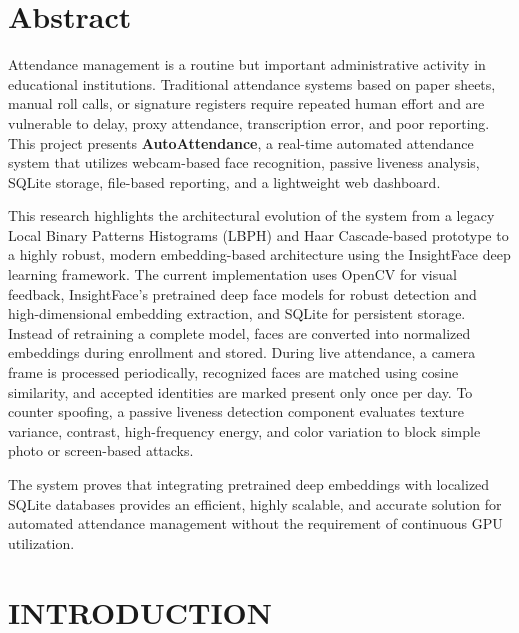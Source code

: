 \documentclass[12pt,a4paper]{report}
\newcommand{\JustifiedNormal}{\fontsize{12}{14}\selectfont\justifying\setlength{\parindent}{0pt}}
\begin{document}
\clearpage

\chapter*{Abstract}
\vspace{2em}
\JustifiedNormal
Attendance management is a routine but important administrative activity in educational institutions. Traditional attendance systems based on paper sheets, manual roll calls, or signature registers require repeated human effort and are vulnerable to delay, proxy attendance, transcription error, and poor reporting. This project presents \textbf{AutoAttendance}, a real-time automated attendance system that utilizes webcam-based face recognition, passive liveness analysis, SQLite storage, file-based reporting, and a lightweight web dashboard.

This research highlights the architectural evolution of the system from a legacy Local Binary Patterns Histograms (LBPH) and Haar Cascade-based prototype to a highly robust, modern embedding-based architecture using the InsightFace deep learning framework. The current implementation uses OpenCV for visual feedback, InsightFace's pretrained deep face models for robust detection and high-dimensional embedding extraction, and SQLite for persistent storage. Instead of retraining a complete model, faces are converted into normalized embeddings during enrollment and stored. During live attendance, a camera frame is processed periodically, recognized faces are matched using cosine similarity, and accepted identities are marked present only once per day. To counter spoofing, a passive liveness detection component evaluates texture variance, contrast, high-frequency energy, and color variation to block simple photo or screen-based attacks. 

The system proves that integrating pretrained deep embeddings with localized SQLite databases provides an efficient, highly scalable, and accurate solution for automated attendance management without the requirement of continuous GPU utilization.

\clearpage

\setcounter{page}{1}

\chapter{INTRODUCTION}
\end{document}

